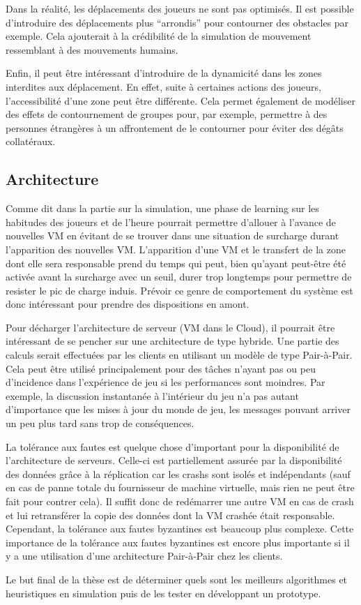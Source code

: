 Dans la réalité, les déplacements des joueurs ne sont pas optimisés.
Il est possible d'introduire des déplacements plus ``arrondis'' pour contourner des obstacles par exemple.
Cela ajouterait à la crédibilité de la simulation de mouvement ressemblant à des mouvements humains.

Enfin, il peut être intéressant d'introduire de la dynamicité dans les zones interdites aux déplacement.
En effet, suite à certaines actions des joueurs, l'accessibilité d'une zone peut être différente.
Cela permet également de modéliser des effets de contournement de groupes pour, par exemple, permettre à des personnes étrangères à un affrontement de le contourner pour éviter des dégâts collatéraux.

\subsection{Architecture}

Comme dit dans la partie sur la simulation, une phase de learning sur les habitudes des joueurs et de l'heure pourrait permettre d'allouer à l'avance de nouvelles VM en évitant de se trouver dans une situation de surcharge durant l'apparition des nouvelles VM.
L'apparition d'une VM et le transfert de la zone dont elle sera responsable prend du temps qui peut, bien qu'ayant peut-être été activée avant la surcharge avec un seuil, durer trop longtemps pour permettre de resister le pic de charge induis.
Prévoir ce genre de comportement du système est donc intéressant pour prendre des dispositions en amont.

Pour décharger l'architecture de serveur (VM dans le Cloud), il pourrait être intéressant de se pencher sur une architecture de type hybride.
Une partie des calculs serait effectuées par les clients en utilisant un modèle de type Pair-à-Pair.
Cela peut être utilisé principalement pour des tâches n'ayant pas ou peu d'incidence dans l'expérience de jeu si les performances sont moindres.
Par exemple, la discussion instantanée à l'intérieur du jeu n'a pas autant d'importance que les mises à jour du monde de jeu, les messages pouvant arriver un peu plus tard sans trop de conséquences.

La tolérance aux fautes est quelque chose d'important pour la disponibilité de l'architecture de serveurs.
Celle-ci est partiellement assurée par la disponibilité des données grâce à la réplication car les crashs sont isolés et indépendants (sauf en cas de panne totale du fournisseur de machine virtuelle, mais rien ne peut être fait pour contrer cela).
Il suffit donc de redémarrer une autre VM en cas de crash et lui retransférer la copie des données dont la VM crashée était responsable.
Cependant, la tolérance aux fautes byzantines est beaucoup plus complexe.
Cette importance de la tolérance aux fautes byzantines est encore plus importante si il y a une utilisation d'une architecture Pair-à-Pair chez les clients.

Le but final de la thèse est de déterminer quels sont les meilleurs algorithmes et heuristiques en simulation puis de les tester en développant un prototype.
